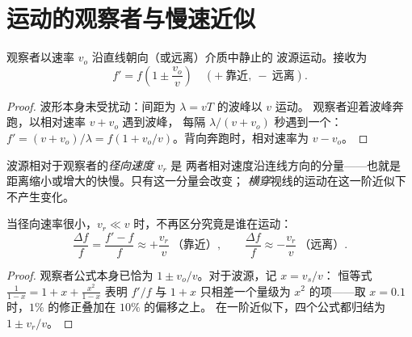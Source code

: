\section{运动的观察者与慢速近似}

\begin{proposition}[运动的观察者]\label{prop:g12:doppler-effect:moving-observer}
观察者以速率 $v_o$ 沿直线朝向（或远离）介质中静止的
波源运动。接收为
\[ f' = f\left(1 \pm \frac{v_o}{v}\right) \quad (+\ \text{靠近},\ -\ \text{远离}). \]
\end{proposition}

\begin{proof}
波形本身未受扰动：间距为 $\lambda = vT$ 的波峰以 $v$ 运动。
观察者迎着波峰奔跑，以相对速率 $v + v_o$ 遇到波峰，
每隔 $\lambda/(v + v_o)$ 秒遇到一个：$f' = (v + v_o)/\lambda = f(1 + v_o/v)$。背向奔跑时，相对速率为 $v - v_o$。
\end{proof}

\begin{definition}[径向速度]\label{def:g12:doppler-effect:radial}
波源相对于观察者的\emph{径向速度} $v_r$ 是
两者相对速度沿连线方向的分量——也就是
距离缩小或增大的快慢。只有这一分量会改变；
\emph{横穿}视线的运动在这一阶近似下不产生变化。
\end{definition}

\begin{proposition}\label{prop:g12:doppler-effect:slow}
当径向速率很小，$v_r \ll v$ 时，不再区分究竟是谁在运动：
\[
\frac{\Delta f}{f} = \frac{f' - f}{f} \approx +\frac{v_r}{v} \ \text{（靠近）},
\qquad
\frac{\Delta f}{f} \approx -\frac{v_r}{v} \ \text{（远离）}.
\]
\end{proposition}

\begin{proof}
观察者公式本身已恰为 $1 \pm v_o/v$。对于波源，记 $x = v_s/v$：
恒等式 $\frac{1}{1 - x} = 1 + x + \frac{x^2}{1 - x}$ 表明 $f'/f$ 与
$1 + x$ 只相差一个量级为 $x^2$ 的项——取 $x = 0.1$ 时，$1\%$ 的修正叠加在 $10\%$ 的偏移之上。
在一阶近似下，四个公式都归结为 $1 \pm v_r/v$。
\end{proof}

